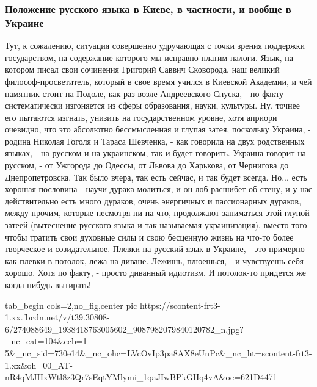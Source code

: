  
 
 
 
 

\subsubsection{Положение русского языка в Киеве, в частности, и вообще в Украине}

Тут, к сожалению, ситуация совершенно удручающая с точки зрения поддержки
государством, на содержание которого мы исправно платим налоги. Язык, на
котором писал свои сочинения Григорий Саввич Сковорода, наш великий
философ-просветитель, который в свое время учился в Киевской Академии, и чей
памятник стоит на Подоле, как раз возле Андреевского Спуска, - по факту
систематически изгоняется из сферы образования, науки, культуры. Ну, точнее его
пытаются изгнать, унизить на государственном уровне, хотя априори очевидно, что
это абсолютно бессмысленная и глупая затея, поскольку Украина, - родина Николая
Гоголя и Тараса Шевченка, - как говорила на двух родственных языках, - на
русском и на украинском, так и будет говорить. Украина говорит на русском, - от
Ужгорода до Одессы, от Львова до Харькова, от Чернигова до Днепропетровска. Так
было вчера, так есть сейчас, и так будет всегда. Но... есть хорошая пословица -
научи дурака молиться, и он лоб расшибет об стену, и у нас действительно есть
много дураков, очень энергичных и пассионарных дураков, между прочим, которые
несмотря ни на что, продолжают заниматься этой глупой затеей (вытеснение
русского языка и так называемая украинизация), вместо того чтобы тратить свои
духовные силы и свою бесценную жизнь на что-то более творческое и
созидательное. Плевки на русский язык в Украине, - это примерно как плевки в
потолок, лежа на диване.  Лежишь, плюешься, - и чувствуешь себя хорошо. Хотя по
факту, - просто диванный идиотизм. И потолок-то придется же когда-нибудь
вытирать!

\ifcmt
  tab_begin cols=2,no_fig,center
     pic https://scontent-frt3-1.xx.fbcdn.net/v/t39.30808-6/274088649_1938418763005602_9087982079840120782_n.jpg?_nc_cat=104&ccb=1-5&_nc_sid=730e14&_nc_ohc=LVcOvIp3pa8AX8eUnPc&_nc_ht=scontent-frt3-1.xx&oh=00_AT-nR4qMJHxWtl8z3Qr7sEqtYMlymi_1qaJIwBPkGHq4vA&oe=621D4471


